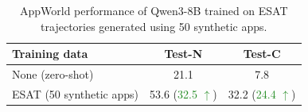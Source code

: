 \begin{table}[t!]
\centering
\small
\setlength{\tabcolsep}{3pt}
\begin{tabular*}{\linewidth}{@{\extracolsep{\fill}}lcc@{}}
\toprule
\textbf{Training data} & \textbf{Test-N} & \textbf{Test-C} \\
\midrule
None (zero-shot) & 21.1 & \phantom{0}7.8\\
\midrule
ESAT (50 synthetic apps) & 53.6 (\textcolor{ForestGreen}{32.5 $\uparrow$})  &   32.2 (\textcolor{ForestGreen}{24.4 $\uparrow$}) \\
\bottomrule
\end{tabular*}
\caption{AppWorld performance of Qwen3-8B trained on \textsc{ESAT} trajectories generated using 50 synthetic apps.}
\label{tab:synth_apps_only}
\end{table}